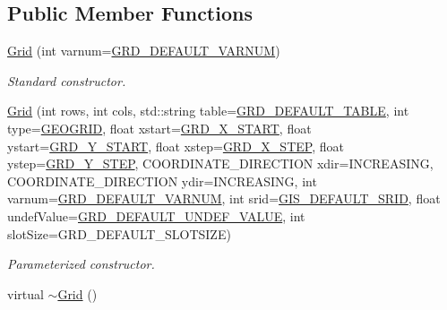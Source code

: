 \subsection*{Public Member Functions}
\begin{DoxyCompactItemize}
\item 
\hypertarget{classfwi_1_1grid_1_1Grid_a1328a3f31a8b8fb007597dfd6bcf1cbd}{\hyperlink{classfwi_1_1grid_1_1Grid_a1328a3f31a8b8fb007597dfd6bcf1cbd}{Grid} (int varnum=\hyperlink{fwi__define_8h_a0b5ef1a7f011a268d5767ad76dc0d2f3}{G\-R\-D\-\_\-\-D\-E\-F\-A\-U\-L\-T\-\_\-\-V\-A\-R\-N\-U\-M})}\label{classfwi_1_1grid_1_1Grid_a1328a3f31a8b8fb007597dfd6bcf1cbd}

\begin{DoxyCompactList}\small\item\em Standard constructor. \end{DoxyCompactList}\item 
\hyperlink{classfwi_1_1grid_1_1Grid_aa3834cf6b13445bf8eb53b6ebe1cfb71}{Grid} (int rows, int cols, std\-::string table=\hyperlink{fwi__define_8h_a2a3ae53495ee4efc3c35a2acc837603c}{G\-R\-D\-\_\-\-D\-E\-F\-A\-U\-L\-T\-\_\-\-T\-A\-B\-L\-E}, int type=\hyperlink{fwi__define_8h_aea937ca2785273f5b96467b2b3f3d22d}{G\-E\-O\-G\-R\-I\-D}, float xstart=\hyperlink{fwi__define_8h_aba5ceb4d7323417c50fdc179ce915020}{G\-R\-D\-\_\-\-X\-\_\-\-S\-T\-A\-R\-T}, float ystart=\hyperlink{fwi__define_8h_a08e286b41c7e537fde7ecebff1c59ce3}{G\-R\-D\-\_\-\-Y\-\_\-\-S\-T\-A\-R\-T}, float xstep=\hyperlink{fwi__define_8h_ab0465700b128a48e19c72d90119a96e1}{G\-R\-D\-\_\-\-X\-\_\-\-S\-T\-E\-P}, float ystep=\hyperlink{fwi__define_8h_a3b5df539b73755a7159b0e38bc69ce7a}{G\-R\-D\-\_\-\-Y\-\_\-\-S\-T\-E\-P}, C\-O\-O\-R\-D\-I\-N\-A\-T\-E\-\_\-\-D\-I\-R\-E\-C\-T\-I\-O\-N xdir=I\-N\-C\-R\-E\-A\-S\-I\-N\-G, C\-O\-O\-R\-D\-I\-N\-A\-T\-E\-\_\-\-D\-I\-R\-E\-C\-T\-I\-O\-N ydir=I\-N\-C\-R\-E\-A\-S\-I\-N\-G, int varnum=\hyperlink{fwi__define_8h_a0b5ef1a7f011a268d5767ad76dc0d2f3}{G\-R\-D\-\_\-\-D\-E\-F\-A\-U\-L\-T\-\_\-\-V\-A\-R\-N\-U\-M}, int srid=\hyperlink{fwi__define_8h_a039f584144fef5765f3541a17f8dc3c4}{G\-I\-S\-\_\-\-D\-E\-F\-A\-U\-L\-T\-\_\-\-S\-R\-I\-D}, float undef\-Value=\hyperlink{fwi__define_8h_a7682eceef088f1177c13859d3d7ce43d}{G\-R\-D\-\_\-\-D\-E\-F\-A\-U\-L\-T\-\_\-\-U\-N\-D\-E\-F\-\_\-\-V\-A\-L\-U\-E}, int slot\-Size=G\-R\-D\-\_\-\-D\-E\-F\-A\-U\-L\-T\-\_\-\-S\-L\-O\-T\-S\-I\-Z\-E)
\begin{DoxyCompactList}\small\item\em Parameterized constructor. \end{DoxyCompactList}\item 
\hypertarget{classfwi_1_1grid_1_1Grid_af9301a4e3301edfe6faf65d71a563037}{virtual \hyperlink{classfwi_1_1grid_1_1Grid_af9301a4e3301edfe6faf65d71a563037}{$\sim$\-Grid} ()}\label{classfwi_1_1grid_1_1Grid_af9301a4e3301edfe6faf65d71a563037}


\end{DoxyCompactItemize}
